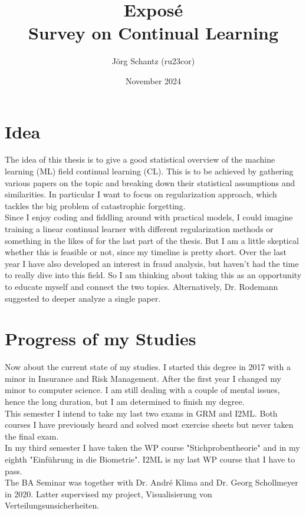 \documentclass[12pt, a4paper]{report}
\title{Exposé\\
	\Large{Survey on Continual Learning}}
\author{Jörg Schantz (ru23cor)}
\date{November 2024}
\begin{document}
	\maketitle
	\renewcommand{\labelenumii}{\arabic{enumi}.\arabic{enumii}}
	\renewcommand{\labelenumiii}{\arabic{enumi}.\arabic{enumii}.\arabic{enumiii}}
	\renewcommand{\labelenumiv}{\arabic{enumi}.\arabic{enumii}.arabic{enumiii}.\arabic{enumiv}}
\section*{Idea}
	The idea of this thesis is to give a good statistical overview of the machine learning (ML) field continual learning (CL). This is to be achieved by gathering various papers on the topic and breaking down their statistical assumptions and similarities. In particular I want to focus on regularization approach, which tackles the big problem of catastrophic forgetting.\\
	Since I enjoy coding and fiddling around with practical models, I could imagine training a linear continual learner with different regularization methods or something in the likes of for the last part of the thesis. But I am a little skeptical whether this is feasible or not, since my timeline is pretty short. Over the last year I have also developed an interest in fraud analysis, but haven't had the time to really dive into this field. So I am thinking about taking this as an opportunity to educate myself and connect the two topics. Alternatively, Dr. Rodemann suggested to deeper analyze a single paper.\\
\section*{Progress of my Studies}
	Now about the current state of my studies. I started this degree in	2017 with a minor in Insurance and Risk Management. After the first year I changed my minor to computer science. I am still dealing with a couple of mental issues, hence the long duration, but I am determined to finish my degree.\\
	This semester I intend to take my last two exams in GRM and I2ML. Both courses I have previously heard and solved most exercise sheets but never taken the final exam.\\
	In my third semester I have taken the WP course "Stichprobentheorie" and in my eighth "Einführung in die Biometrie". I2ML is my last WP course that I have to pass.\\
	The BA Seminar was together with Dr. André Klima and Dr. Georg Schollmeyer in 2020. Latter supervised my project, Visualisierung von Verteilungsunsicherheiten.
\end{document}
